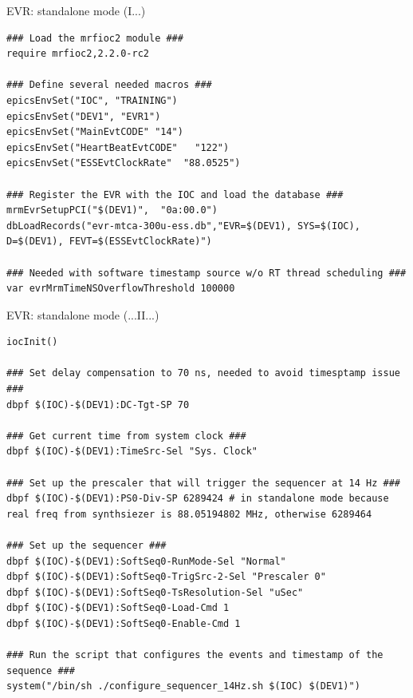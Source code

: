 \documentclass[
  9pt
  , table
  , ignorenonframetext
]{beamer}
\begin{document}
\begin{frame}[fragile]{EVR: standalone mode (I...)}
\begin{lstlisting}[style=termstyle,breaklines=true,basicstyle=\scriptsize]
### Load the mrfioc2 module ###
require mrfioc2,2.2.0-rc2

### Define several needed macros ###
epicsEnvSet("IOC", "TRAINING")
epicsEnvSet("DEV1", "EVR1")
epicsEnvSet("MainEvtCODE" "14")
epicsEnvSet("HeartBeatEvtCODE"   "122")
epicsEnvSet("ESSEvtClockRate"  "88.0525")

### Register the EVR with the IOC and load the database ###
mrmEvrSetupPCI("$(DEV1)",  "0a:00.0")
dbLoadRecords("evr-mtca-300u-ess.db","EVR=$(DEV1), SYS=$(IOC), D=$(DEV1), FEVT=$(ESSEvtClockRate)")

### Needed with software timestamp source w/o RT thread scheduling ###
var evrMrmTimeNSOverflowThreshold 100000

\end{lstlisting}
\end{frame}

\begin{frame}[fragile]{EVR: standalone mode (...II...)}
\begin{lstlisting}[style=termstyle,breaklines=true,basicstyle=\scriptsize]
iocInit()

### Set delay compensation to 70 ns, needed to avoid timesptamp issue ###
dbpf $(IOC)-$(DEV1):DC-Tgt-SP 70

### Get current time from system clock ###
dbpf $(IOC)-$(DEV1):TimeSrc-Sel "Sys. Clock"

### Set up the prescaler that will trigger the sequencer at 14 Hz ###
dbpf $(IOC)-$(DEV1):PS0-Div-SP 6289424 # in standalone mode because real freq from synthsiezer is 88.05194802 MHz, otherwise 6289464

### Set up the sequencer ###
dbpf $(IOC)-$(DEV1):SoftSeq0-RunMode-Sel "Normal"
dbpf $(IOC)-$(DEV1):SoftSeq0-TrigSrc-2-Sel "Prescaler 0"
dbpf $(IOC)-$(DEV1):SoftSeq0-TsResolution-Sel "uSec"
dbpf $(IOC)-$(DEV1):SoftSeq0-Load-Cmd 1
dbpf $(IOC)-$(DEV1):SoftSeq0-Enable-Cmd 1

### Run the script that configures the events and timestamp of the sequence ###
system("/bin/sh ./configure_sequencer_14Hz.sh $(IOC) $(DEV1)")

\end{lstlisting}
\end{frame}
\end{document}
